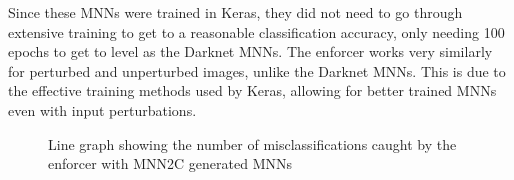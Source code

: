 Since these \acp{MNN} were trained in Keras, they did not need to go through extensive training to get to a reasonable classification accuracy, only needing 100 epochs to get to level as the Darknet \acp{MNN}.
The enforcer works very similarly for perturbed and unperturbed images, unlike the Darknet \acp{MNN}.
This is due to the effective training methods used by Keras, allowing for better trained \acp{MNN} even with input perturbations.


\begin{figure}[t]
	\centering
	\scalebox{0.9}{}
	\caption{Line graph showing the number of misclassifications caught by the enforcer with \ac{MNN2C} generated \acp{MNN} \label{fig:sign-graphboth-mnn2c}}
\end{figure}





















